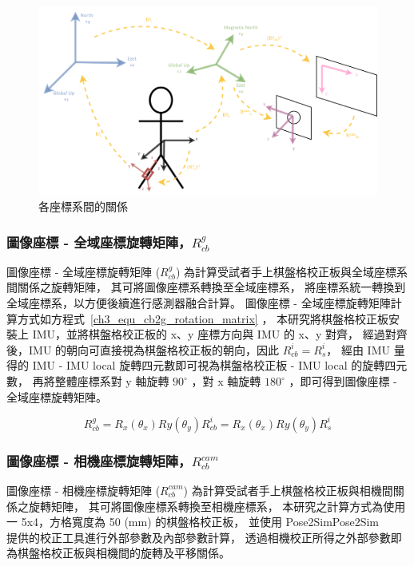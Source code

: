 \begin{figure}[!ht]
   \centering
   \includegraphics[width=\textwidth]{figure/ch3_fig_coordinate_trans.png}
    \caption[各座標系間的關係]{各座標系間的關係}
    \label{ch3_fig_coordinate_trans}
\end{figure}

\subsubsection{圖像座標 - 全域座標旋轉矩陣，$R^{g}_{cb}$}
圖像座標 - 全域座標旋轉矩陣 ($R^{g}_{cb}$) 為計算受試者手上棋盤格校正板與全域座標系間關係之旋轉矩陣，
其可將圖像座標系轉換至全域座標系，
將座標系統一轉換到全域座標系，以方便後續進行感測器融合計算。
圖像座標 - 全域座標旋轉矩陣計算方式如方程式~\ref{ch3_equ_cb2g_rotation_matrix} ，
本研究將棋盤格校正板安裝上 IMU，並將棋盤格校正板的 x、y 座標方向與 IMU 的 x、y 對齊，
經過對齊後，IMU 的朝向可直接視為棋盤格校正板的朝向，因此 $R^{i}_{cb} = R^{i}_{s}$，
經由 IMU 量得的 IMU - IMU local 旋轉四元數即可視為棋盤格校正板 - IMU local 的旋轉四元數，
再將整體座標系對 y 軸旋轉 $90^{\circ}$ ，對 x 軸旋轉 $180^{\circ}$ ，即可得到圖像座標 - 全域座標旋轉矩陣。

\begin{equation}
   R^{g}_{cb} = R_{x}(\theta_{x})R{y}(\theta_{y})R^{i}_{cb} = R_{x}(\theta_{x})R{y}(\theta_{y})R^{i}_{s}
   \label{ch3_equ_cb2g_rotation_matrix}
\end{equation}

\subsubsection{圖像座標 - 相機座標旋轉矩陣，$R^{cam}_{cb}$}
圖像座標 - 相機座標旋轉矩陣 ($R^{cam}_{cb}$) 為計算受試者手上棋盤格校正板與相機間關係之旋轉矩陣，
其可將圖像座標系轉換至相機座標系，
本研究之計算方式為使用一 5x4，方格寬度為 50 (mm) 的棋盤格校正板，
並使用 Pose2SimPose2Sim~\cite{Pagnon_2021_Robustness}~\cite{Pagnon_2022_Accuracy}~\cite{Pagnon_2022_JOSS} 提供的校正工具進行外部參數及內部參數計算，
透過相機校正所得之外部參數即為棋盤格校正板與相機間的旋轉及平移關係。

